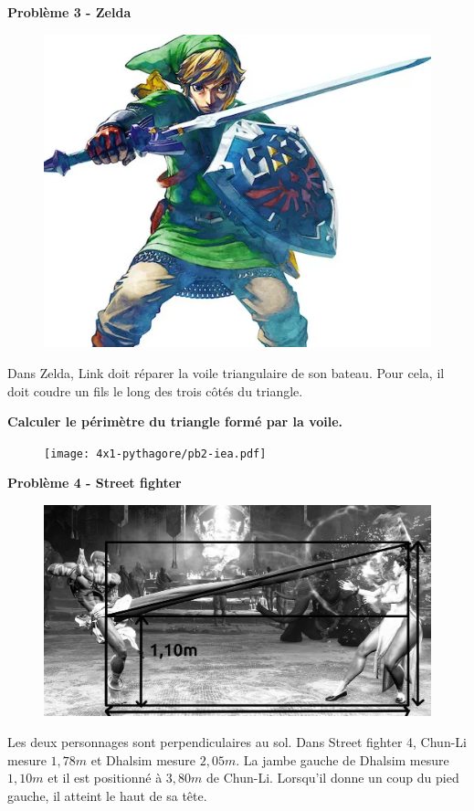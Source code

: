 \begin{multicols}{2} 
  \textbf{Problème 3 - Zelda} \\

  \begin{figure}[H]
    \centering
    \includegraphics[width=0.5\linewidth]{4x1-pythagore/pb1-link.png}
  \end{figure}

  Dans Zelda, Link doit réparer la voile triangulaire de son bateau. Pour cela, il doit coudre un fils le long des trois côtés du triangle. 

  \textbf{Calculer le périmètre du triangle formé par la voile.} \columnbreak

  \begin{figure}[H]
    \centering
    \texttt{[image: 4x1-pythagore/pb2-iea.pdf]}
  \end{figure}

\end{multicols}

\textbf{Problème 4 - Street fighter} \\

\begin{figure}[H]
  \centering
  \includegraphics[width=0.5\linewidth]{4x1-pythagore/sf4.jpg}
\end{figure}

Les deux personnages sont perpendiculaires au sol. Dans Street fighter 4, Chun-Li mesure $1,78m$ et Dhalsim mesure $2,05m$. La jambe gauche de Dhalsim mesure $1,10m$ et il est positionné à $3,80m$ de Chun-Li. Lorsqu'il donne un coup du pied gauche, il atteint le haut de sa tête. 

